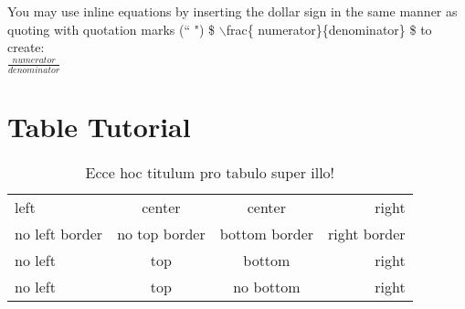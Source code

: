 \documentclass{article}
\begin{document}
\noindent You may use inline equations by inserting the dollar sign in the same manner as quoting with quotation marks (`` ") \$ $\backslash$frac\{ numerator\}\{denominator\} \$ to create:  \\




\indent \qquad \quad  $\frac{numerator}{denominator}$		%


\pagebreak

\section{Table Tutorial}



\begin{table}[h!]				%
\caption{Ecce hoc titulum pro tabulo super illo!}
\centering
\begin{tabular}{ l | c | c | r | }
left & center & center & right \\
no left border & no top border & bottom border & right border \\ 
\hline 
no left & top & bottom & right \\
\hline
no left & top & no bottom & right \\


\end{tabular}
\end{table}
\end{document}
